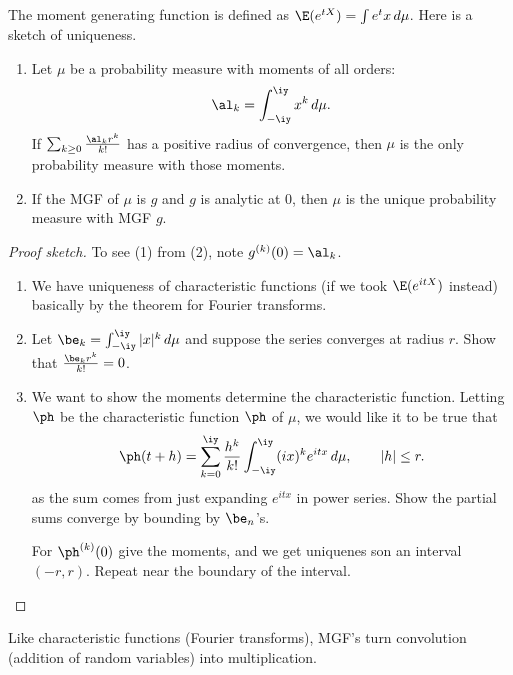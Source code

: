 The moment generating function is defined as $\E(e^{tX})=\int e^tx\,d\mu$. Here is a sketch of uniqueness.
\begin{thm}
\begin{enumerate}
\item
Let $\mu$ be a probability measure
 with moments of all orders:
\[
\al_k=\int_{-\iy}^{\iy} x^k\,d\mu.
\]
If $\sum_{k\ge 0}\frac{\al_kr^k}{k!}$ has a positive radius of convergence, then $\mu$ is the only probability measure with those moments.
\item If the MGF of $\mu$ is $g$ and $g$ is analytic at 0, then $\mu$ is the unique probability measure with MGF $g$.
\end{enumerate}
\end{thm}
\begin{proof}[Proof sketch]
To see (1) from (2), note $g^{(k)}(0)=\al_k$.

\begin{enumerate}
\item We have uniqueness of characteristic functions (if we took $\E(e^{itX})$ instead) basically by the theorem for Fourier transforms.
\item
Let $\be_k = \int_{-\iy}^{\iy} |x|^k\,d\mu$ and suppose the series converges at radius $r$. Show that $\frac{\be_kr^k}{k!}=0$.
\item 
We want to show the moments determine the characteristic function. Letting $\ph$ be the characteristic function $\ph$ of $\mu$, we would like it to be true that
\[
\ph(t+h)=
\sum_{k=0}^\iy \frac{h^k}{k!}\int_{-\iy}^{\iy} (ix)^k e^{itx}\,d\mu ,\qquad |h|\le r.
\]
as the sum comes from just expanding $e^{itx}$ in power series. Show the partial sums converge by bounding by $\be_{n}$'s.

For $\ph^{(k)}(0)$ give the moments, and we get uniquenes son an interval $(-r,r)$. Repeat near the boundary of the interval. 
\end{enumerate}
\end{proof}

Like characteristic functions (Fourier transforms), MGF's turn convolution (addition of random variables) into multiplication.

